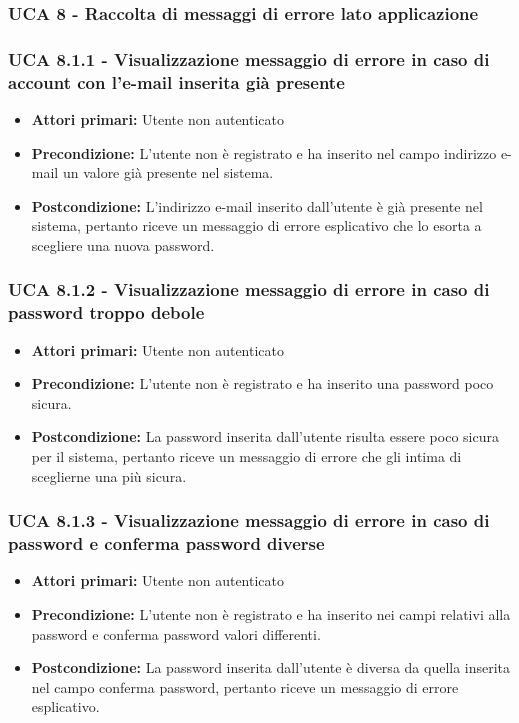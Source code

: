 \subsubsection{UCA 8 - Raccolta di messaggi di errore lato applicazione}
\subsubsection{UCA 8.1.1 - Visualizzazione messaggio di errore in caso di account con l'e-mail inserita già presente}%
\begin{itemize}
\item \textbf{Attori primari:} Utente non autenticato
\item \textbf{Precondizione:} L'utente non è registrato e ha inserito nel campo indirizzo e-mail un valore già presente nel sistema.
\item \textbf{Postcondizione:} L'indirizzo e-mail inserito dall'utente è già presente nel sistema, pertanto riceve un messaggio di errore esplicativo che lo esorta a scegliere una nuova password.
\end{itemize}

\subsubsection{UCA 8.1.2 - Visualizzazione messaggio di errore in caso di password troppo debole}%
\begin{itemize}
\item \textbf{Attori primari:} Utente non autenticato
\item \textbf{Precondizione:} L'utente non è registrato e ha inserito una password poco sicura.
\item \textbf{Postcondizione:} La password inserita dall'utente risulta essere poco sicura per il sistema, pertanto riceve un messaggio di errore che gli intima di sceglierne una più sicura.
\end{itemize}

\subsubsection{UCA 8.1.3 - Visualizzazione messaggio di errore in caso di password e conferma password diverse}%
\begin{itemize}
\item \textbf{Attori primari:} Utente non autenticato
\item \textbf{Precondizione:} L'utente non è registrato e ha inserito nei campi relativi alla password e conferma password valori differenti.
\item \textbf{Postcondizione:} La password inserita dall'utente è diversa da quella inserita nel campo conferma password, pertanto riceve un messaggio di errore esplicativo.
\end{itemize}

